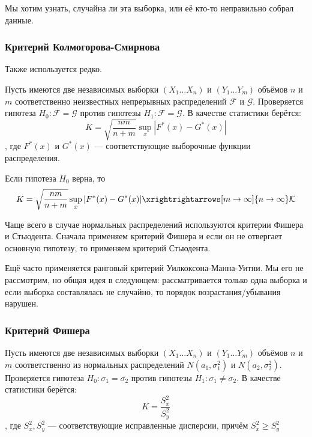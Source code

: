 Мы хотим узнать, случайна ли эта выборка, или её кто-то неправильно собрал данные.

\subsubsection{Критерий Колмогорова-Смирнова}

Также используется редко.

Пусть имеются две независимых выборки \((X_1 \dots X_n)\) и \((Y_1 \dots Y_m)\) объёмов \(n\) и \(m\) соответственно неизвестных непрерывных распределений \(\mathcal{F}\) и \(\mathcal{G}\). Проверяется гипотеза \(H_0 : \mathcal{F} = \mathcal{G}\) против гипотезы \(H_1 : \mathcal{F} = \mathcal{G}\). В качестве статистики берётся:
\[K = \sqrt{\frac{nm}{n + m}} \sup_x |F^*(x) - G^*(x)|\]
, где \(F^*(x)\) и \(G^*(x)\) --- соответствующие выборочные функции распределения.

\begin{theorem}
    Если гипотеза \(H_0\) верна, то
    \[K = \sqrt{\frac{nm}{n + m}} \sup_x |F^*(x) - G^*(x)| \xrightrightarrows[m \to \infty]{n \to \infty} \mathcal{K}\]
\end{theorem}

\begin{remark}
    Чаще всего в случае нормальных распределений используются критерии Фишера и Стьюдента. Сначала применяем критерий Фишера и если он не отвергает основную гипотезу, то применяем критерий Стьюдента.

    Ещё часто применяется ранговый критерий Уилкоксона-Манна-Уитни. Мы его не рассмотрим, но общая идея в следующем: рассматривается только одна выборка и если выборка составлялась не случайно, то порядок возрастания/убывания нарушен.
\end{remark}

\subsubsection{Критерий Фишера}

Пусть имеются две независимых выборки \((X_1 \dots X_n)\) и \((Y_1 \dots Y_m)\) объёмов \(n\) и \(m\) соответственно из нормальных распределений \(N(a_1, \sigma_1^2)\) и \(N(a_2, \sigma_2^2)\). Проверяется гипотеза \(H_0 : \sigma_1 = \sigma_2\) против гипотезы \(H_1 : \sigma_1 \neq \sigma_2\). В качестве статистики берётся:
\[K = \frac{S_x^2}{S_y^2}\]
, где \(S_x^2, S_y^2\) --- соответствующие исправленные дисперсии, причём \(S_x^2 \geq S_y^2\)

